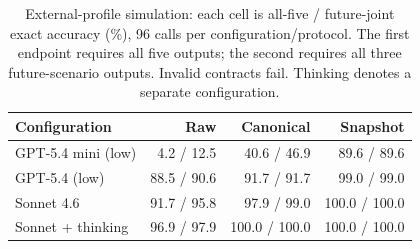 \begin{table}[t]
\centering
\small
\setlength{\tabcolsep}{3pt}
\begin{tabular}{lrrr}
\toprule
Configuration & Raw & Canonical & Snapshot \\
\midrule
GPT-5.4 mini (low) & 4.2 / 12.5 & 40.6 / 46.9 & 89.6 / 89.6 \\
GPT-5.4 (low) & 88.5 / 90.6 & 91.7 / 91.7 & 99.0 / 99.0 \\
Sonnet 4.6 & 91.7 / 95.8 & 97.9 / 99.0 & 100.0 / 100.0 \\
Sonnet + thinking & 96.9 / 97.9 & 100.0 / 100.0 & 100.0 / 100.0 \\
\bottomrule
\end{tabular}
\caption{External-profile simulation: each cell is all-five / future-joint exact accuracy (\%), 96 calls per configuration/protocol. The first endpoint requires all five outputs; the second requires all three future-scenario outputs. Invalid contracts fail. Thinking denotes a separate configuration.}
\label{tab:external}
\end{table}
